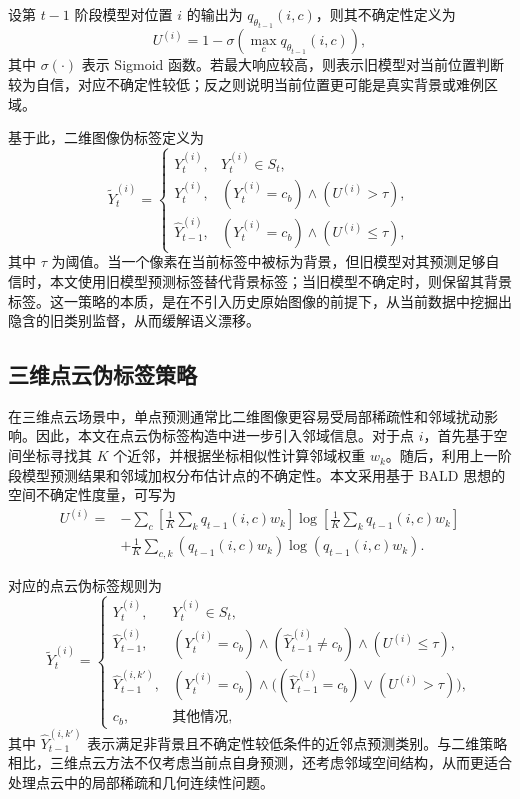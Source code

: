 设第 $t-1$ 阶段模型对位置 $i$ 的输出为 $q_{\theta_{t-1}}(i,c)$，则其不确定性定义为
\begin{equation}
U^{(i)} = 1 - \sigma\left(\max_c q_{\theta_{t-1}}(i,c)\right),
\label{eq:2d_uncertainty}
\end{equation}
其中 $\sigma(\cdot)$ 表示 Sigmoid 函数。若最大响应较高，则表示旧模型对当前位置判断较为自信，对应不确定性较低；反之则说明当前位置更可能是真实背景或难例区域。

基于此，二维图像伪标签定义为
\begin{equation}
\tilde{Y}_t^{(i)}=
\begin{cases}
Y_t^{(i)}, & Y_t^{(i)} \in S_t, \\
Y_t^{(i)}, & (Y_t^{(i)}=c_b) \wedge (U^{(i)} > \tau), \\
\hat{Y}_{t-1}^{(i)}, & (Y_t^{(i)}=c_b) \wedge (U^{(i)} \leq \tau),
\end{cases}
\label{eq:2d_pseudo}
\end{equation}
其中 $\tau$ 为阈值。当一个像素在当前标签中被标为背景，但旧模型对其预测足够自信时，本文使用旧模型预测标签替代背景标签；当旧模型不确定时，则保留其背景标签。这一策略的本质，是在不引入历史原始图像的前提下，从当前数据中挖掘出隐含的旧类别监督，从而缓解语义漂移。

\subsection{三维点云伪标签策略}

在三维点云场景中，单点预测通常比二维图像更容易受局部稀疏性和邻域扰动影响。因此，本文在点云伪标签构造中进一步引入邻域信息。对于点 $i$，首先基于空间坐标寻找其 $K$ 个近邻，并根据坐标相似性计算邻域权重 $w_k$。随后，利用上一阶段模型预测结果和邻域加权分布估计点的不确定性。本文采用基于 BALD 思想的空间不确定性度量，可写为
\begin{equation}
\begin{aligned}
U^{(i)} = &- \sum_c \left[\frac{1}{K}\sum_k q_{t-1}(i,c)w_k\right]
\log\left[\frac{1}{K}\sum_k q_{t-1}(i,c)w_k\right] \\
&+ \frac{1}{K}\sum_{c,k} \left(q_{t-1}(i,c)w_k\right)
\log\left(q_{t-1}(i,c)w_k\right).
\end{aligned}
\label{eq:3d_uncertainty}
\end{equation}

对应的点云伪标签规则为
\begin{equation}
\tilde{Y}_t^{(i)}=
\begin{cases}
Y_t^{(i)}, & Y_t^{(i)} \in S_t, \\
\hat{Y}_{t-1}^{(i)}, & (Y_t^{(i)}=c_b) \wedge (\hat{Y}_{t-1}^{(i)} \neq c_b) \wedge (U^{(i)} \leq \tau), \\
\hat{Y}_{t-1}^{(i,k')}, & (Y_t^{(i)}=c_b) \wedge \big((\hat{Y}_{t-1}^{(i)}=c_b) \vee (U^{(i)} > \tau)\big), \\
c_b, & \text{其他情况},
\end{cases}
\label{eq:3d_pseudo}
\end{equation}
其中 $\hat{Y}_{t-1}^{(i,k')}$ 表示满足非背景且不确定性较低条件的近邻点预测类别。与二维策略相比，三维点云方法不仅考虑当前点自身预测，还考虑邻域空间结构，从而更适合处理点云中的局部稀疏和几何连续性问题。

